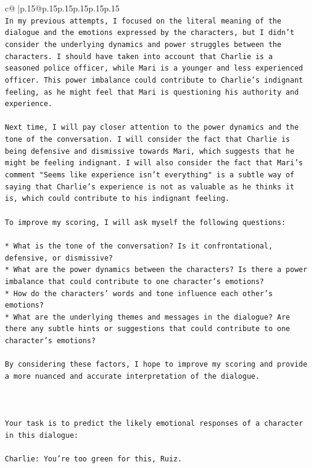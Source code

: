 \documentclass{article}
\begin{document}
{\begin{supertabular}{c@{$\;$}|p{.15\linewidth}@{}p{.15\linewidth}p{.15\linewidth}p{.15\linewidth}p{.15\linewidth}p{.15\linewidth}}
{{{\\ 
\texttt{In my previous attempts, I focused on the literal meaning of the dialogue and the emotions expressed by the characters, but I didn't consider the underlying dynamics and power struggles between the characters. I should have taken into account that Charlie is a seasoned police officer, while Mari is a younger and less experienced officer. This power imbalance could contribute to Charlie's indignant feeling, as he might feel that Mari is questioning his authority and experience.} \\
\\ 
\texttt{Next time, I will pay closer attention to the power dynamics and the tone of the conversation. I will consider the fact that Charlie is being defensive and dismissive towards Mari, which suggests that he might be feeling indignant. I will also consider the fact that Mari's comment "Seems like experience isn't everything" is a subtle way of saying that Charlie's experience is not as valuable as he thinks it is, which could contribute to his indignant feeling.} \\
\\ 
\texttt{To improve my scoring, I will ask myself the following questions:} \\
\\ 
\texttt{* What is the tone of the conversation? Is it confrontational, defensive, or dismissive?} \\
\texttt{* What are the power dynamics between the characters? Is there a power imbalance that could contribute to one character's emotions?} \\
\texttt{* How do the characters' words and tone influence each other's emotions?} \\
\texttt{* What are the underlying themes and messages in the dialogue? Are there any subtle hints or suggestions that could contribute to one character's emotions?} \\
\\ 
\texttt{By considering these factors, I hope to improve my scoring and provide a more nuanced and accurate interpretation of the dialogue.} \\
\\ 
\\ 
\\ 
\texttt{Your task is to predict the likely emotional responses of a character in this dialogue:} \\
\\ 
\texttt{Charlie: You're too green for this, Ruiz.} \\
}}}
\end{supertabular}}
\end{document}
